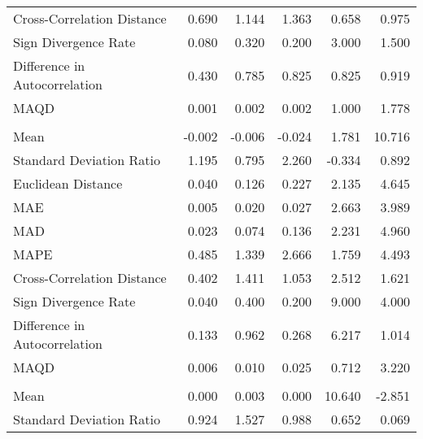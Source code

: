 \begin{landscape}
\begin{ThreePartTable}
\begin{longtable}[t]{lrrrrr}
\hspace{1em}Cross-Correlation Distance & 0.690 & 1.144 & 1.363 & 0.658 & 0.975\\
\hspace{1em}Sign Divergence Rate & 0.080 & 0.320 & 0.200 & 3.000 & 1.500\\
\hspace{1em}Difference in Autocorrelation & 0.430 & 0.785 & 0.825 & 0.825 & 0.919\\
\hspace{1em}MAQD & 0.001 & 0.002 & 0.002 & 1.000 & 1.778\\
\addlinespace[0.5em]
\multicolumn{6}{l}{\textbf{JOR}}\\
\hline
\hspace{1em}Mean & -0.002 & -0.006 & -0.024 & 1.781 & 10.716\\
\hspace{1em}Standard Deviation Ratio & 1.195 & 0.795 & 2.260 & -0.334 & 0.892\\
\hspace{1em}Euclidean Distance & 0.040 & 0.126 & 0.227 & 2.135 & 4.645\\
\hspace{1em}MAE & 0.005 & 0.020 & 0.027 & 2.663 & 3.989\\
\hspace{1em}MAD & 0.023 & 0.074 & 0.136 & 2.231 & 4.960\\
\hspace{1em}MAPE & 0.485 & 1.339 & 2.666 & 1.759 & 4.493\\
\hspace{1em}Cross-Correlation Distance & 0.402 & 1.411 & 1.053 & 2.512 & 1.621\\
\hspace{1em}Sign Divergence Rate & 0.040 & 0.400 & 0.200 & 9.000 & 4.000\\
\hspace{1em}Difference in Autocorrelation & 0.133 & 0.962 & 0.268 & 6.217 & 1.014\\
\hspace{1em}MAQD & 0.006 & 0.010 & 0.025 & 0.712 & 3.220\\
\addlinespace[0.5em]
\multicolumn{6}{l}{\textbf{JPN}}\\
\hline
\hspace{1em}Mean & 0.000 & 0.003 & 0.000 & 10.640 & -2.851\\
\hspace{1em}Standard Deviation Ratio & 0.924 & 1.527 & 0.988 & 0.652 & 0.069\\

\end{longtable}
\end{ThreePartTable}
\end{landscape}

